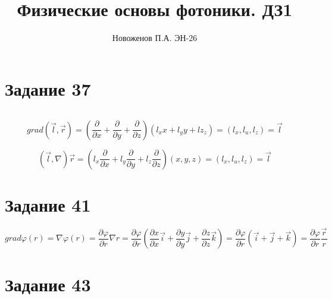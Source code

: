 \documentclass[14pt, a4paper]{article}
\title{Физические основы фотоники. ДЗ1}
\author{Новоженов П.А. ЭН-26}
\date{}
\begin{document}
\maketitle

\newpage

\section*{Задание 37}
    $$$$

    $$grad(\vec l, \vec r) = (\frac{\partial }{\partial x} + \frac{\partial }{\partial y} + \frac{\partial }{\partial z})(l_xx+l_yy+lz_z) = (l_x, l_u, l_z) = \vec l$$

    $$(\vec l, \nabla)\vec r = (l_x\frac{\partial }{\partial x} + l_y\frac{\partial }{\partial y} + l_z\frac{\partial }{\partial z})(x,y,z) = (l_x, l_u, l_z) = \vec l$$

\section*{Задание 41}
    $$grad\varphi(r) = \nabla\varphi(r) = \frac{\partial \varphi}{\partial r} \nabla r = \frac{\partial \varphi}{\partial r} \left(\frac{\partial x}{\partial x}\vec i + \frac{\partial y}{\partial y}\vec j + \frac{\partial z}{\partial z}\vec k\right) = 
\frac{\partial \varphi}{\partial r} (\vec i + \vec j + \vec k) = 
\frac{\partial \varphi}{\partial r}\frac{\vec r}{r}$$


    

    

\section*{Задание 43}
\end{document}
